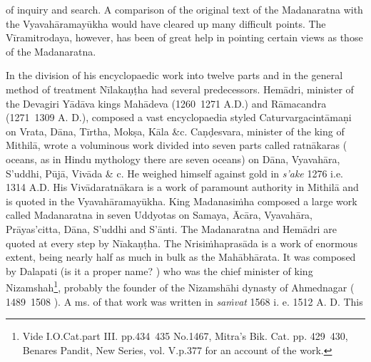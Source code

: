 \documentclass[11pt, openany]{book}
\begin{document}
\noindent
of inquiry and search. A comparison of the original text of the Madanaratna with the Vyavahāramayūkha would have cleared up many difficult points. The Vīramitrodaya, however, has been of great help in pointing certain views as those of the Madanaratna.

In the division of his encyclopaedic work into twelve parts and in the general method of treatment Nīlakaṇṭha had several predecessors. Hemādri, minister of the Devagiri Yādāva kings Mahādeva (1260\textendash\ 1271 A.D.) and Rāmacandra (1271\textendash\ 1309 A. D.), composed a vast encyclopaedia styled Caturvargacintāmaṇi on Vrata, Dāna, Tīrtha, Mokṣa, Kāla \&c. Caṇḍesvara, minister of the king of Mithilā, wrote a voluminous work divided into seven parts called ratnākaras ( oceans, as in Hindu mythology there are seven oceans) on Dāna, Vyavahāra, S'uddhi, Pūjā, Vivāda \& c. He weighed himself against gold in \emph{\en s'ake} 1276 i.e. 1314 A.D. His Vivādaratnākara is a work of paramount authority in Mithilā and is quoted in the Vyavahāramayūkha. King Madanasiṁha composed a large work called Madanaratna in seven Uddyotas on Samaya, Ācāra, Vyavahāra, Prāyas'citta, Dāna, S'uddhi and S'ānti. The Madanaratna and Hemādri are quoted at every step by Nīakaṇṭha. The Nrisiṁhaprasāda is a work of enormous extent, being nearly half as much in bulk as the Mahābhārata. It was composed by Dalapati (is it a proper name? ) who was the chief minister of king Nizamshah\renewcommand{\thefootnote}{1}\footnote{Vide I.O.Cat.part III. pp.434\textendash\ 435 No.1467, Mitra's Bik. Cat. pp. 429\textendash\ 430, Benares {\qt Pandit}, New Series, vol. V.p.377 for an account of the work.}, probably the founder of the Nizamshāhi dynasty of Ahmednagar ( 1489\textendash\ 1508 ). A ms. of that work was written in \emph{\en saṁvat} 1568 i. e. 1512 A. D. This

\newpage
\end{document}
